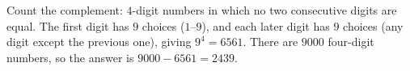 Count the complement: $4$-digit numbers in which no two consecutive digits are equal. The first digit has $9$ choices ($1$--$9$), and each later digit has $9$ choices (any digit except the previous one), giving $9^4=6561$. There are $9000$ four-digit numbers, so the answer is $9000-6561=\boxed{2439}$.

